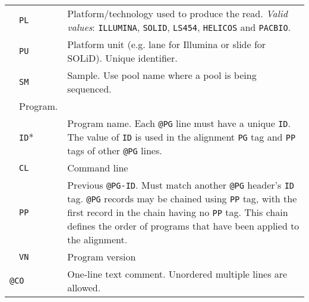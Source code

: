 \documentclass[10pt]{article}
\begin{document}
\begin{center}
\begin{longtable}{|l|l|p{13.5cm}|}
  & {\tt PL} & Platform/technology used to produce the read. \emph{Valid values}:
  {\tt ILLUMINA}, {\tt SOLID}, {\tt LS454}, {\tt HELICOS} and {\tt PACBIO}.\\\cline{2-3}
  & {\tt PU} & Platform unit (e.g. lane for Illumina or slide for SOLiD). Unique identifier.\\\cline{2-3}
  & {\tt SM} & Sample. Use pool name where a pool is being sequenced.\\\cline{1-3}\pagebreak\hline
  \multicolumn{2}{|l}{\tt @PG} & Program. \\\cline{2-3}
  & {\tt ID}* & Program name. Each {\tt @PG} line must have a unique {\tt ID}. The value of {\tt ID} is used in the alignment {\tt PG} tag and {\tt PP} tags of other {\tt @PG} lines.\\\cline{2-3}
  & {\tt CL} & Command line \\\cline{2-3}
  & {\tt PP} & Previous {\tt @PG-ID}. Must match another {\tt @PG} header's {\tt ID} tag. {\tt @PG} records may be chained using {\tt PP} tag, with the first record in the chain having no {\tt PP} tag. This chain defines the order of programs that have been applied to the alignment. \\\cline{2-3}
  & {\tt VN} & Program version \\\cline{1-3}
  \multicolumn{2}{|l}{\tt @CO} & One-line text comment. Unordered multiple lines are allowed.\\
  \cline{1-3}
\end{longtable}
\end{center}
\end{document}
